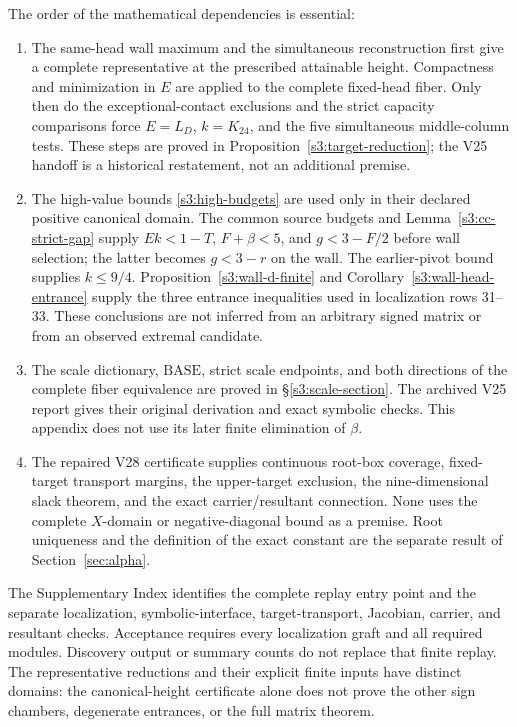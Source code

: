 \documentclass[11pt,reqno]{amsart}
\theoremstyle{definition}
\theoremstyle{remark}
\begin{document}
The order of the mathematical dependencies is essential:
\begin{enumerate}
\item The same-head wall maximum and the simultaneous reconstruction
 first give a complete representative at the prescribed attainable
 height. Compactness and minimization in \(E\) are applied to the
 complete fixed-head fiber. Only then do the exceptional-contact
 exclusions and the strict capacity comparisons force
 \(E=L_D\), \(k=K_{24}\), and the five simultaneous middle-column
 tests. These steps are proved in
 Proposition~\ref{s3:target-reduction}; the V25 handoff is a
 historical restatement, not an additional premise.
\item The high-value bounds \eqref{s3:high-budgets} are used only in
 their declared positive canonical domain. The common source budgets
 and Lemma~\ref{s3:cc-strict-gap} supply
 \(Ek<1-T\), \(F+\beta<5\), and \(g<3-F/2\) before wall
 selection; the latter becomes \(g<3-r\) on the wall. The
 earlier-pivot bound supplies \(k\le9/4\).
 Proposition~\ref{s3:wall-d-finite} and
 Corollary~\ref{s3:wall-head-entrance} supply the three entrance
 inequalities used in localization rows 31--33. These conclusions
 are not inferred from an arbitrary signed matrix or from an
 observed extremal candidate.
\item The scale dictionary, \(\mathrm{BASE}\), strict scale endpoints,
 and both directions of the complete fiber equivalence are proved in
 \S\ref{s3:scale-section}. The archived V25 report gives their
 original derivation and exact symbolic checks. This appendix does
 not use its later finite elimination of \(\beta\).
\item The repaired V28 certificate supplies continuous root-box
 coverage, fixed-target transport margins, the upper-target
 exclusion, the nine-dimensional slack theorem, and the exact
 carrier/resultant connection. None uses the complete \(X\)-domain
 or negative-diagonal bound as a premise. Root uniqueness and the
 definition of the exact constant are the separate result of
 Section~\ref{sec:alpha}.
\end{enumerate}

The Supplementary Index identifies the complete replay entry point and
the separate localization, symbolic-interface, target-transport,
Jacobian, carrier, and resultant checks. Acceptance requires every
localization graft and all required modules. Discovery output or summary
counts do not replace that finite replay. The representative reductions
and their explicit finite inputs have distinct domains: the
canonical-height certificate alone does not prove the other sign
chambers, degenerate entrances, or the full matrix theorem.
\end{document}
